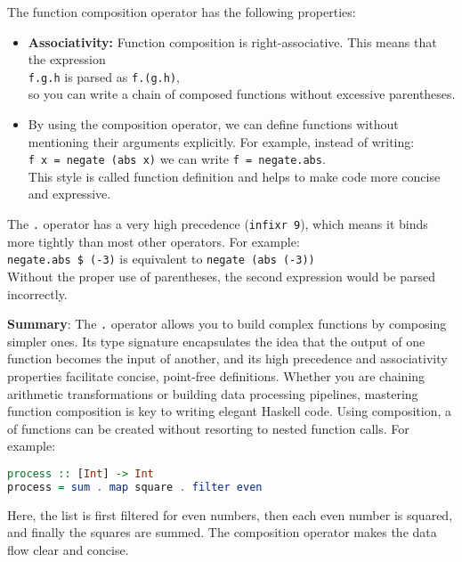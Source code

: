 \noindent
The function composition operator has the following properties:
\begin{itemize}
  \item \textbf{Associativity:} Function composition is right-associative. This means that the expression
        \\[0.2cm]
        \hspace*{1.3cm}
        \texttt{f\;.\;g\;.\;h} \quad is parsed as \quad \texttt{f\;.\;(g\;.\;h)},
        \\[0.2cm]
        so you can write a chain of composed functions without excessive parentheses.
  \item By using the composition operator, we can define functions without
        mentioning their arguments explicitly. For example, instead of writing: 
        \\[0.2cm]
        \hspace*{1.3cm}
        \texttt{f x = negate (abs x)} \quad we can write \quad \texttt{f = negate\;.\;abs}.
        \\[0.2cm]
        This style is called  function definition and helps to make code more concise and expressive.
\end{itemize}
The \texttt{.} operator has a very high precedence (\texttt{infixr 9}), which means it binds more tightly than most other operators. For example:
\\[0.2cm]
\hspace*{1.3cm}
\texttt{negate\;.\;abs \$ (-3)} \quad is equivalent to \quad \texttt{negate (abs (-3))}
\\[0.2cm]
Without the proper use of parentheses, the second expression would be parsed incorrectly.
\vspace*{0.2cm}

\noindent
\textbf{Summary}: The \texttt{.} operator allows you to build complex functions by composing simpler ones. Its
type signature encapsulates the idea that the output of one function becomes the input of another, and its high
precedence and associativity properties facilitate concise, point-free definitions. Whether you are chaining
arithmetic transformations or building data processing pipelines, mastering function composition is key to
writing elegant Haskell code. 
Using composition, a  of functions can be created without resorting to nested function calls. For example:
\begin{lstlisting}[style=haskellstyle, language=Haskell]
process :: [Int] -> Int
process = sum . map square . filter even
\end{lstlisting}
Here, the list is first filtered for even numbers, then each even number is squared, and finally the squares
are summed. The composition operator makes the data flow clear and concise. 

